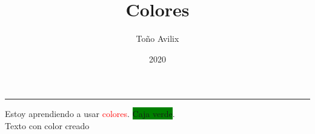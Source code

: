 \documentclass{article}
\title{Colores}
\author{Toño Avilix}
\date{2020}
\begin{document}
\maketitle
{\color{Aquamarine}\rule{\linewidth}{1.5mm}} %
Estoy aprendiendo a usar \textcolor{Red}{colores}. %
\colorbox{Green}{Caja verde}.\\ %
\textcolor{micolor}{Texto con color creado} %
\end{document}
